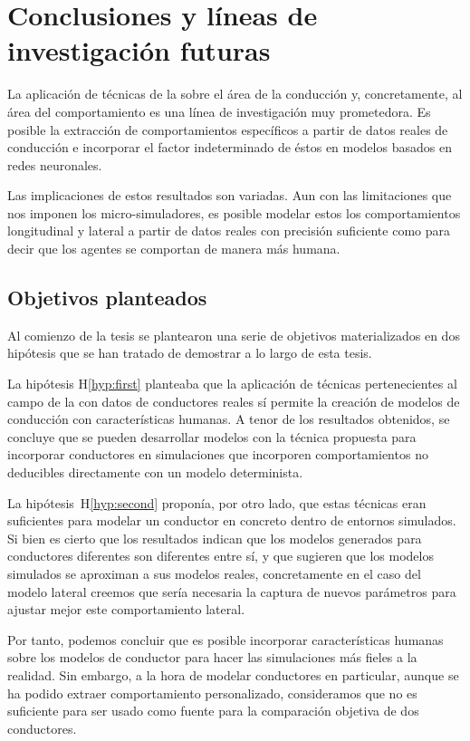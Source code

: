 \chapter{Conclusiones y líneas de investigación futuras}
\label{ch:conclusions}

La aplicación de técnicas de la  sobre el área de la conducción y, concretamente, al área del comportamiento es una línea de investigación muy prometedora. Es posible la extracción de comportamientos específicos a partir de datos reales de conducción e incorporar el factor indeterminado de éstos en modelos basados en redes neuronales.

Las implicaciones de estos resultados son variadas. Aun con las limitaciones que nos imponen los micro-simuladores, es posible modelar estos los comportamientos longitudinal y lateral a partir de datos reales con precisión suficiente como para decir que los agentes se comportan de manera más humana.

\section{Objetivos planteados}

Al comienzo de la tesis se plantearon una serie de objetivos materializados en dos hipótesis que se han tratado de demostrar a lo largo de esta tesis.

La hipótesis H\ref{hyp:first} planteaba que la aplicación de técnicas pertenecientes al campo de la  con datos de conductores reales sí permite la creación de modelos de conducción con características humanas. A tenor de los resultados obtenidos, se concluye que se pueden desarrollar modelos con la técnica propuesta para incorporar conductores en simulaciones que incorporen comportamientos no deducibles directamente con un modelo determinista.

La hipótesis~H\ref{hyp:second} proponía, por otro lado, que estas técnicas eran suficientes para modelar un conductor en concreto dentro de entornos simulados. Si bien es cierto que los resultados indican que los modelos generados para conductores diferentes son diferentes entre sí, y que sugieren que los modelos simulados se aproximan a sus modelos reales, concretamente en el caso del modelo lateral creemos que sería necesaria la captura de nuevos parámetros para ajustar mejor este comportamiento lateral.

Por tanto, podemos concluir que es posible incorporar características humanas sobre los modelos de conductor para hacer las simulaciones más fieles a la realidad. Sin embargo, a la hora de modelar conductores en particular, aunque se ha podido extraer comportamiento personalizado, consideramos que no es suficiente para ser usado como fuente para la comparación objetiva de dos conductores.

